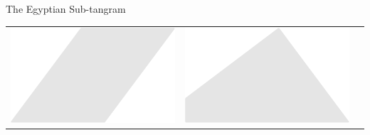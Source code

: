 \documentclass[14pt]{beamer}
\begin{document}
\begin{frame}{The Egyptian Sub-tangram}
\begin{center}
\begin{tabular}{ccc}
                \;\;\includegraphics[scale=0.3]{figures/figure023g.pdf} \;\;&
                \;\;\includegraphics[scale=0.3]{figures/figure023i.pdf} \\
            \end{tabular}

            \bigskip\bigskip
        \end{center}
    \end{frame}

\end{document}
